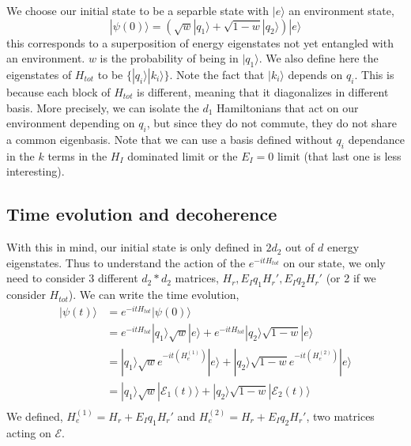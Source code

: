 \documentclass{article}
\begin{document}
We choose our initial state to be a separble state with $|e\rangle$ an environment state,
\begin{equation}
    |\psi(0)\rangle=(\sqrt{w}|q_1\rangle+\sqrt{1-w}|q_2\rangle)|e\rangle
\end{equation}
this corresponds to a superposition of energy eigenstates not yet entangled with an environment. $w$ is the probability of being in $|q_1\rangle$. We also define here the eigenstates of $H_{tot}$ to be $\{|q_i\rangle|k_i\rangle\}$. Note the fact that $|k_i\rangle$ depends on $q_i$. This is because each block of $H_{tot}$ is different, meaning that it diagonalizes in different basis. More precisely, we can isolate the $d_1$ Hamiltonians that act on our environment depending on $q_i$, but since they do not commute, they do not share a common eigenbasis. Note that we can use a basis defined without $q_i$ dependance in the $k$ terms in the $H_I$ dominated limit or the $E_I=0$ limit (that last one is less interesting).


\subsection{Time evolution and decoherence}

With this in mind, our initial state is only defined in $2d_2$ out of $d$ energy eigenstates. Thus to understand the action of the $e^{-itH_{tot}}$ on our state, we only need to consider 3 different $d_2*d_2$ matrices, $H_r, E_Iq_1H_r', E_Iq_2H_r'$ (or 2 if we consider $H_{tot}$). We can write the time evolution,
\begin{align}
    |\psi(t)\rangle &= e^{-itH_{tot}}|\psi(0)\rangle\\
    &=e^{-itH_{tot}}|q_1\rangle\sqrt{w}|e\rangle+e^{-itH_{tot}}|q_2\rangle\sqrt{1-w}|e\rangle\\
    &=|q_1\rangle\sqrt{w}e^{-it(H_e^{(1)})}|e\rangle+|q_2\rangle\sqrt{1-w}e^{-it(H_e^{(2)})}|e\rangle\\
    &= |q_1\rangle\sqrt{w}|\mathcal{E}_1(t)\rangle+|q_2\rangle\sqrt{1-w}|\mathcal{E}_2(t)\rangle\\
\label{eq:time_evo_global}
\end{align}
We defined, $H_e^{(1)}=H_r + E_Iq_1H_r'$ and $H_e^{(2)}=H_r + E_Iq_2H_r'$, two matrices acting on $\mathcal{E}$.\\
\end{document}
